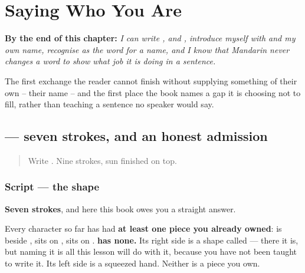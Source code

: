 
\chapter{Saying Who You Are}
\label{ch:zh-mingzi}

\begin{chapteropening}
\textbf{By the end of this chapter:} \emph{I can write ,  and , introduce myself with  and my own name, recognise  as the word for a name, and I know that Mandarin never changes a word to show what job it is doing in a sentence.}

The first exchange the reader cannot finish without supplying something of their own -- their name -- and the first place the book names a gap it is choosing not to fill, rather than teaching a sentence no speaker would say.
\end{chapteropening}

\section[\texorpdfstring{\zh{我} (wǒ)}{我 (wǒ)}]{ — seven strokes, and an honest admission}

\label{lesson:ZH-W08-wo}



\begin{quote}
Write . Nine strokes, sun finished on top.
\end{quote}

\subsection*{Script — the shape}

\begin{quote}
\end{quote}

\textbf{Seven strokes}, and here this book owes you a straight answer.

Every character so far has had \textbf{at least one piece you already owned}:  is  beside ,  sits on ,  sits on . \textbf{ has none.} Its right side is a shape called  — there it is, but naming it is all this lesson will do with it, because you have not been taught to write it. Its left side is a squeezed hand. Neither is a piece you own.

